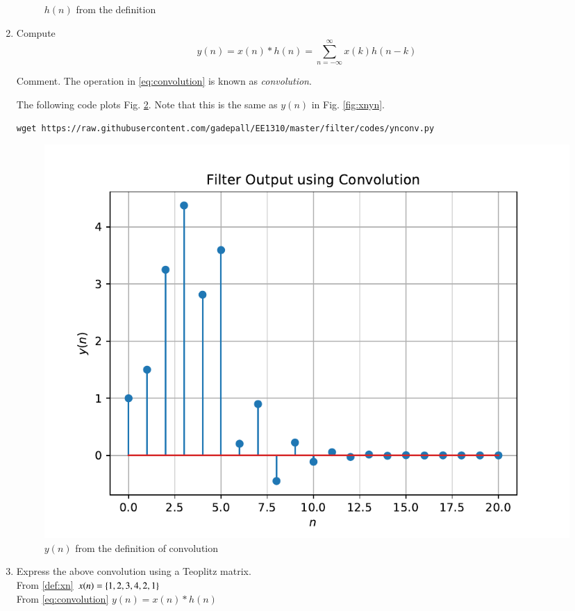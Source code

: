 \documentclass[journal,12pt,twocolumn]{IEEEtran}
\renewcommand\thesection{\arabic{section}}
\begin{document}
\begin{enumerate}[label=\thesection.\arabic*]
\begin{figure}[!ht]
			\caption{$h(n)$ from the definition}
			\label{fig:hndef}
		\end{figure}
		\item Compute 
		\begin{equation}
			\label{eq:convolution}
			y(n) = x(n)*h(n) = \sum_{n=-\infty}^{\infty}x(k)h(n-k)
		\end{equation}
		
		Comment. The operation in \eqref{eq:convolution} is known as
		{\em convolution}.
		
		\solution The following code plots Fig. \ref{fig:ynconv}. Note that this is the same as 
		$y(n)$ in  Fig. 
		\ref{fig:xnyn}. 
		\begin{lstlisting}
wget https://raw.githubusercontent.com/gadepall/EE1310/master/filter/codes/ynconv.py
		\end{lstlisting}
		\begin{figure}[!ht]
			\centering
			\includegraphics[width=\columnwidth]{./figs/ynconv}
			\caption{\small $y(n)$ from the definition of convolution}
			\label{fig:ynconv}
		\end{figure}
	\vspace{5cm}
		\item Express the above convolution using a Teoplitz matrix.\\
		\solution From \eqref{def:xn}
				$x(n) = \left\{1,2,3,4,2,1\right\}$\\
			From \eqref{eq:convolution}	$y(n) = x(n)*h(n)$\\

\end{enumerate}
\end{document}
